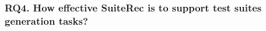 \documentclass[conference]{IEEEtran}
\begin{document}
\subsubsection{RQ4. How effective \textsf{SuiteRec} is to support test suites generation tasks?}




\end{document}
